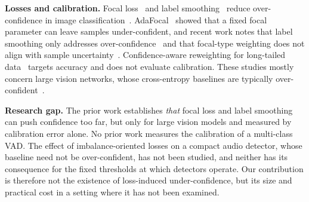 \documentclass[conference]{IEEEtran}
\begin{document}
\textbf{Losses and calibration.} Focal loss~\cite{lin2017focal} and label smoothing~\cite{muller2019labelsmoothing} reduce over-confidence in image classification~\cite{mukhoti2020focal}. AdaFocal~\cite{ghosh2022adafocal} showed that a fixed focal parameter can leave samples under-confident, and recent work notes that label smoothing only addresses over-confidence~\cite{bahavan2026fedlas} and that focal-type weighting does not align with sample uncertainty~\cite{lin2025uwg}. Confidence-aware reweighting for long-tailed data~\cite{jagati2026ccar} targets accuracy and does not evaluate calibration. These studies mostly concern large vision networks, whose cross-entropy baselines are typically over-confident~\cite{guo2017calibration}.

\textbf{Research gap.} The prior work establishes \emph{that} focal loss and label smoothing can push confidence too far, but only for large vision models and measured by calibration error alone. No prior work measures the calibration of a multi-class VAD. The effect of imbalance-oriented losses on a compact audio detector, whose baseline need not be over-confident, has not been studied, and neither has its consequence for the fixed thresholds at which detectors operate. Our contribution is therefore not the existence of loss-induced under-confidence, but its size and practical cost in a setting where it has not been examined.
\end{document}
